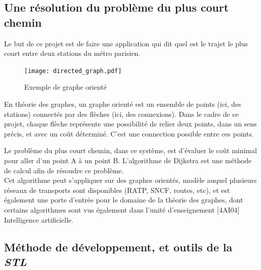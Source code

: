 \documentclass[9pts]{article}
\begin{document}
\subsection{Une résolution du problème du plus court chemin}
Le but de ce projet est de faire une application qui dit quel est le trajet le plus court entre deux stations du métro parisien.

\begin{figure}[h]
   \centering
   \texttt{[image: directed\_graph.pdf]}
   \caption{\label{directed_graph} Exemple de graphe orienté}
\end{figure}

En théorie des graphes, un graphe orienté est un ensemble de points (ici, des stations) connectés par des flèches (ici, des connexions). Dans le cadre de ce projet, chaque flèche représente une possibilité de relier deux points, dans un sens précis, et avec un coût déterminé. C'est une connection possible entre ces points.

Le problème du plus court chemin, dans ce système, est d'évaluer le coût minimal pour aller d'un point A à un point B. L'algorithme de Dijkstra est une méthode de calcul afin de résoudre ce problème.\\

Cet algorithme peut s'appliquer sur des graphes orientés, modèle auquel plusieurs réseaux de transports sont disponibles (RATP, SNCF, routes, etc), et est également une porte d'entrée pour le domaine de la théorie des graphes, dont certains algorithmes sont vus également dans l'unité d'enseignement [4AI04] Intelligence artificielle.\\

\subsection{Méthode de développement, et outils de la \emph{STL}}
\end{document}
